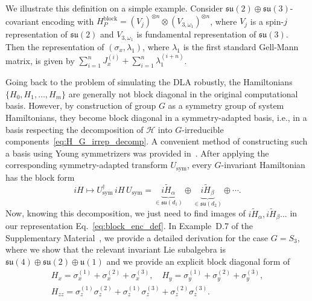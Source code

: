 \documentclass[10pt,twocolumn,superscriptaddress,aps,amsmath,amssymb,citeautoscript,floatfix,prx,longbibliography]{revtex4-2}
\newcounter{alg}
\theoremstyle{plain}
\theoremstyle{plain}
\theoremstyle{plain}
\theoremstyle{plain}
\theoremstyle{plain}
\theoremstyle{plain}
\begin{document}
We illustrate this definition on a simple example. Consider $\mathfrak{su}(2)\oplus \mathfrak{su}(3)$-covariant encoding
with $H_P^{\mathrm{block}}=\left(V_j\right)^{\otimes n}\otimes (V_{3, \omega_1})^{\otimes n}$, where $V_j$ is a spin-$j$ representation of $\mathfrak{su}(2)$ and $V_{3, \omega_1}$ is fundamental representation of $\mathfrak{su}(3)$. Then the representation of $(\sigma_x, \lambda_1)$, where $\lambda_1$ is the first standard Gell-Mann matrix, is given by $\sum_{i=1}^{n} J_x^{(i)}+\sum_{i=1}^n \lambda_1^{(i+n)}$.

Going back to the problem of simulating the DLA robustly, the Hamiltonians
\(\{H_0, H_1,\ldots, H_m\}\) are generally not block diagonal in the original computational basis. However, by construction of group $G$ as a symmetry group of system Hamiltonians, they become block diagonal in a symmetry-adapted basis, i.e., in a basis respecting the decomposition of \(\mathcal H\) into \(G\)-irreducible components~\eqref{eq:H_G_irrep_decomp}. A convenient method of constructing such a basis using Young symmetrizers was provided in~\cite{DAlessandroHartwig2021}.
After applying the corresponding symmetry-adapted transform $U_{\mathrm{sym}}$, every \(G\)-invariant Hamiltonian has the block form
\[
    iH
    \longmapsto
    U_{\mathrm{sym}}^{\dagger}\, iH\, U_{\mathrm{sym}}
    =
    \underbrace{i\widetilde H_{\alpha}}_{\in\mathfrak{su}(d_1)}
    \oplus
    \underbrace{i\widetilde H_{\beta}}_{\in\mathfrak{su}(d_2)}
    \oplus
    \cdots.
\]
Now, knowing this decomposition, we just need to find images of $i\widetilde H_{\alpha}, i\widetilde H_{\beta}...$ in our representation Eq.~\eqref{eq:block_enc_def}. In Example~D.7 of the Supplementary Material~\cite{SuppMat}, we provide a detailed derivation for the case \(G=S_3\), where we show that the relevant invariant Lie subalgebra is $\mathfrak{su}(4)\oplus \mathfrak{su}(2)\oplus\mathfrak{u}(1)$ and we provide an explicit block diagonal form of 
\begin{equation}\label{eq:s3_ex_hams}
\begin{gathered}
    H_x=\sigma_x^{(1)}+\sigma_x^{(2)}+\sigma_x^{(3)}, \quad H_y=\sigma_y^{(1)}+\sigma_y^{(2)}+\sigma_y^{(3)}, \\ H_{zz}=\sigma_z^{(1)}\sigma_z^{(2)}+\sigma_z^{(1)}\sigma_z^{(3)}+\sigma_z^{(2)}\sigma_z^{(3)}.
\end{gathered}
\end{equation}
\end{document}
